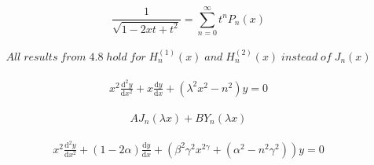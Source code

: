 \[\begin{equation} \label{thrm3.1} {\frac {1}{\sqrt {1-2xt+t^{2}}}}=\sum _{n=0}^{\infty }t^{n}P_{n}(x) \end{equation}\]

\[\begin{align} \label{thrm 4.10} All \; results \; from \; 4.8 \; hold \; for \; H_n^{(1)}(x) \; and \;H_n^{(2)}(x) \; instead \; of \; J_n(x) \end{align}\]

\[\begin{align} \label{thrm4.11(a)} x^2\frac{\mathrm d^2y}{\mathrm dx^2} + x\frac{\mathrm dy}{\mathrm dx} + (\lambda^2x^2-n^2)y = 0 \end{align}\]

\[\begin{align} \label{thrm4.11(b)} AJ_n(\lambda x) + BY_n(\lambda x) \end{align}\]

\[\begin{align} \label{thrm4.12(a)} x^2\frac{\mathrm d^2y}{\mathrm dx^2} + (1-2\alpha)\frac{\mathrm dy}{\mathrm dx} + (\beta^2\gamma^2x^{2\gamma}+(\alpha^2-n^2\gamma^2))y = 0 \end{align}\]


